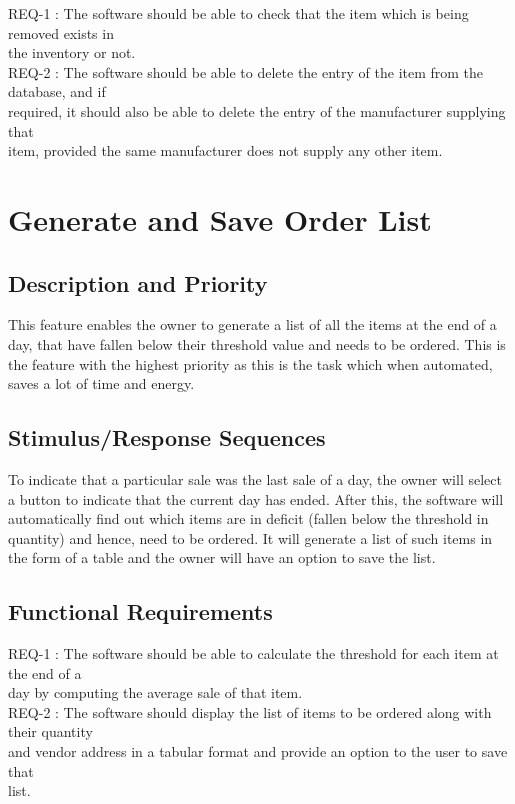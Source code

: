 \documentclass{scrreprt}
\begin{document}
REQ-1 : The software should be able to check that the item which is being removed exists in\\ \hspace*{1.5cm} the  inventory or not.\\
REQ-2 : The software should be able to delete the entry of the item from the database, and if\\ \hspace*{1.5cm} required, it should also be able to delete the entry of the manufacturer supplying that\\\hspace*{1.5cm} item, provided the same manufacturer does not supply any other item.

\pagebreak

\section{Generate and Save Order List}

\subsection{Description and Priority}

This feature enables the owner to generate a list of all the items at the end of a day, that have fallen below their threshold value and needs to be ordered. This is the feature with the highest priority as this is the task which when automated, saves a lot of time and energy.

\subsection{Stimulus/Response Sequences}

To indicate that a particular sale was the last sale of a day, the owner will select a button to indicate that the current day has ended. After this, the software will automatically find out which items are in deficit (fallen below the threshold in quantity) and hence, need to be ordered. It will generate a list of such items in the form of a table and the owner will have an option to save the list.

\subsection{Functional Requirements}

REQ-1 : The software should be able to calculate the threshold for each item at the end of a\\\hspace*{1.5cm} day by computing the average sale of that item.\\
REQ-2 : The software should display the list of items to be ordered along with their quantity\\\hspace*{1.5cm} and vendor address in a tabular format and provide an option to the user to save that\\\hspace*{1.5cm} list.
\end{document}
